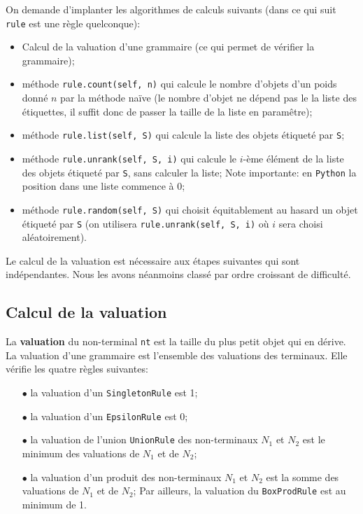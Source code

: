 \documentclass[11pt]{article}
\renewcommand{\emph}[1]{\textbf{#1}}
\newcommand{\Python}{\texttt{Python}\xspace}
\newcommand{\EpsilonRule}{\texttt{EpsilonRule}\xspace}
\newcommand{\SingletonRule}{\texttt{SingletonRule}\xspace}
\newcommand{\UnionRule}{\texttt{UnionRule}\xspace}
\newcommand{\BoxProdRule}{\texttt{BoxProdRule}\xspace}
\begin{document}
On demande d'implanter les algorithmes de calculs suivants (dans ce qui suit
\texttt{rule} est une règle quelconque):
\begin{itemize}
\item Calcul de la valuation d'une grammaire (ce qui permet de vérifier la
  grammaire);
\item méthode \verb+rule.count(self, n)+ qui calcule le nombre d'objets d'un
  poids donné $n$ par la méthode naïve (le nombre d'objet ne dépend pas le la
  liste des étiquettes, il suffit donc de passer la taille de la liste en
  paramêtre);
\item méthode \verb+rule.list(self, S)+ qui calcule la liste des objets
  étiqueté par \verb+S+;
\item méthode \verb+rule.unrank(self, S, i)+ qui calcule le $i$-ème élément de
  la liste des objets étiqueté par \verb+S+, sans calculer la liste; Note importante:
  en \Python{} la position dans une liste commence à $0$;
\item méthode \verb+rule.random(self, S)+ qui choisit équitablement au hasard
  un objet étiqueté par \verb+S+ (on utilisera \verb+rule.unrank(self, S, i)+ où $i$
  sera choisi aléatoirement).
\end{itemize}

Le calcul de la valuation est nécessaire aux étapes suivantes qui sont
indépendantes. Nous les avons néanmoins classé par ordre croissant de difficulté.

\subsection{Calcul de la valuation}

La \emph{valuation} du non-terminal \texttt{nt} est la taille du plus petit
objet qui en dérive. La valuation d'une grammaire est l'ensemble des
valuations des terminaux. Elle vérifie les quatre règles suivantes:
\begin{itemize}
\item[$\bullet$] la valuation d'un \SingletonRule est 1;
\item[$\bullet$] la valuation d'un \EpsilonRule est 0;
\item[$\bullet$] la valuation de l'union \UnionRule des non-terminaux
  $N_1$ et $N_2$ est le minimum des valuations de $N_1$ et de $N_2$;
\item[$\bullet$] la valuation d'un produit des non-terminaux $N_1$
  et $N_2$ est la somme des valuations de $N_1$ et de $N_2$; Par ailleurs,
  la valuation du \BoxProdRule est au minimum de 1.
\end{itemize}
\end{document}
